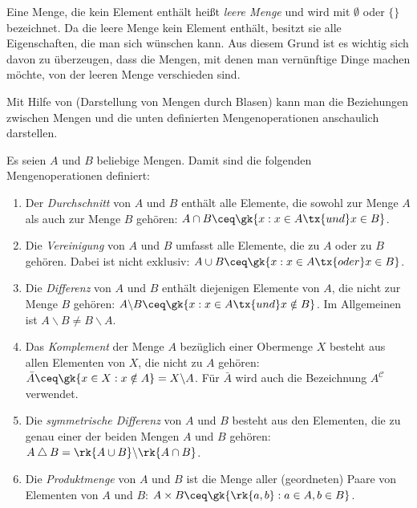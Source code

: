 Eine Menge, die kein Element enthält heißt \emph{leere Menge} und wird mit $\emptyset$ oder $\{\}$ bezeichnet. Da die leere Menge kein Element enthält, besitzt sie alle Eigenschaften, die man sich wünschen kann. Aus diesem Grund ist es wichtig sich davon zu überzeugen, dass die Mengen, mit denen man vernünftige Dinge machen möchte, von der leeren Menge verschieden sind.

Mit Hilfe von  (Darstellung von Mengen durch Blasen) kann man die Beziehungen zwischen Mengen und die unten definierten Mengenoperationen anschaulich darstellen.

\begin{definition}
Es seien $A$ und $B$ beliebige Mengen. Damit sind die folgenden Mengenoperationen definiert:
\begin{enumerate}
\item Der \emph{Durchschnitt} von $A$ und $B$ enthält alle Elemente, die sowohl zur Menge $A$ als auch zur Menge $B$ gehören: $A \cap B \ceq \gk{x : x \in A \tx{ und } x \in B}$.
\item Die \emph{Vereinigung} von $A$ und $B$ umfasst alle Elemente, die zu $A$ oder zu $B$ gehören. Dabei ist  nicht exklusiv: $A \cup B \ceq \gk{x : x \in A \tx{ oder } x \in B}$.
\item Die \emph{Differenz} von $A$ und $B$ enthält diejenigen Elemente von $A$, die nicht zur Menge $B$ gehören: $A \backslash B \ceq \gk{x : x \in A \tx{ und } x \notin B}$. Im Allgemeinen ist $A \backslash B \neq B \backslash A$.
\item Das \emph{Komplement} der Menge $A$ bezüglich einer Obermenge $X$ besteht aus allen Elementen von $X$, die nicht zu $A$ gehören: $\bar{A} \ceq \gk{ x \in X : x \notin A} = X \backslash A$. Für $\bar{A}$ wird auch die Bezeichnung $A^{\mathcal{C}}$ verwendet.
\item Die \emph{symmetrische Differenz} von $A$ und $B$ besteht aus den Elementen, die zu genau einer der beiden Mengen $A$ und $B$ gehören: $A \bigtriangleup B = \rk{A \cup B} \backslash \rk{A \cap B}$.
\item Die \emph{Produktmenge} von $A$ und $B$ ist die Menge aller (geordneten) Paare von Elementen von $A$ und $B$: $A \times B \ceq \gk{\rk{a, b} : a \in A, b \in B}$.
\end{enumerate}
\end{definition}

